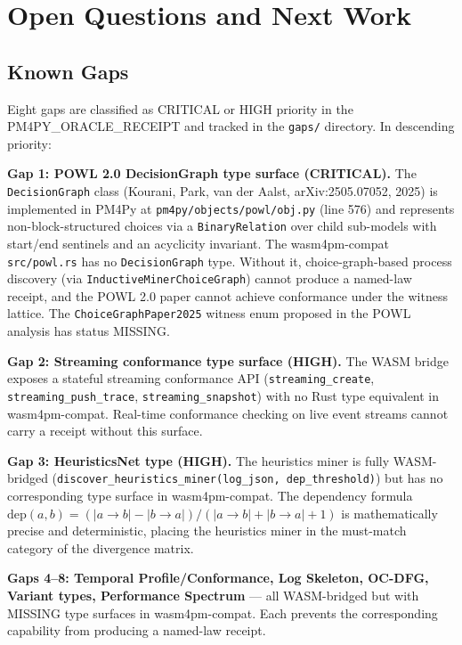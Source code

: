 
\section{Open Questions and Next Work}
\label{sec:sources-pm4py-open}

\subsection{Known Gaps}
\label{sec:sources-pm4py-open-gaps}

Eight gaps are classified as CRITICAL or HIGH priority in the PM4PY\_ORACLE\_RECEIPT and
tracked in the \texttt{gaps/} directory. In descending priority:

\textbf{Gap 1: POWL 2.0 DecisionGraph type surface (CRITICAL).} The
\texttt{DecisionGraph} class (Kourani, Park, van der Aalst, arXiv:2505.07052, 2025) is
implemented in PM4Py at \texttt{pm4py/objects/powl/obj.py} (line 576) and represents
non-block-structured choices via a \texttt{BinaryRelation} over child sub-models with
start/end sentinels and an acyclicity invariant. The wasm4pm-compat \texttt{src/powl.rs}
has no \texttt{DecisionGraph} type. Without it, choice-graph-based process discovery
(via \texttt{InductiveMinerChoiceGraph}) cannot produce a named-law receipt, and the
POWL 2.0 paper cannot achieve conformance under the witness lattice. The
\texttt{ChoiceGraphPaper2025} witness enum proposed in the POWL analysis has status
MISSING.

\textbf{Gap 2: Streaming conformance type surface (HIGH).} The WASM bridge exposes a
stateful streaming conformance API (\texttt{streaming\_create}, \texttt{streaming\_push\_trace},
\texttt{streaming\_snapshot}) with no Rust type equivalent in wasm4pm-compat. Real-time
conformance checking on live event streams cannot carry a receipt without this surface.

\textbf{Gap 3: HeuristicsNet type (HIGH).} The heuristics miner is fully WASM-bridged
(\texttt{discover\_heuristics\_miner(log\_json, dep\_threshold)}) but has no corresponding
type surface in wasm4pm-compat. The dependency formula $\text{dep}(a,b) = (|a \to b| -
|b \to a|) / (|a \to b| + |b \to a| + 1)$ is mathematically precise and deterministic,
placing the heuristics miner in the must-match category of the divergence matrix.

\textbf{Gaps 4--8: Temporal Profile/Conformance, Log Skeleton, OC-DFG, Variant types,
Performance Spectrum} --- all WASM-bridged but with MISSING type surfaces in wasm4pm-compat.
Each prevents the corresponding capability from producing a named-law receipt.

